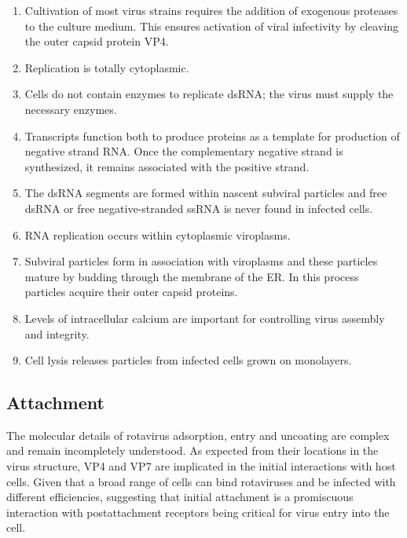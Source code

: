 \documentclass[11pt,final] {article}
\begin{document}
\begin{enumerate}
	\item Cultivation of most virus strains requires the addition of exogenous proteases to the culture medium. This ensures activation of viral infectivity by cleaving the outer capsid protein VP4.

	\item Replication is totally cytoplasmic.
	
	\item Cells do not contain enzymes to replicate dsRNA; the virus must supply the necessary enzymes.
	
	\item Transcripts function both to produce proteins as a template for production of negative strand RNA. Once the complementary negative strand is synthesized, it remains associated with the positive strand.
	
	\item The dsRNA segments are formed within nascent subviral particles and free dsRNA or free negative-stranded ssRNA is never found in infected cells.
	
	\item RNA replication occurs within cytoplasmic viroplasms.
	
	\item Subviral particles form in association with viroplasms and these particles mature by budding through the membrane of the ER. In this process particles acquire their outer capsid proteins.
	
	\item Levels of intracellular calcium are important for controlling virus assembly and integrity.
	
	\item Cell lysis releases particles from infected cells grown on monolayers.
\end{enumerate}

\subsection{Attachment}

The molecular details of rotavirus adsorption, entry and uncoating are complex and remain incompletely understood. As expected from their locations in the virus structure, VP4 and VP7 are implicated in the initial interactions with host cells. Given that a broad range of cells can bind rotaviruses and be infected with different efficiencies, suggesting that initial attachment is a promiscuous interaction with postattachment receptors being critical for virus entry into the cell.
\end{document}
